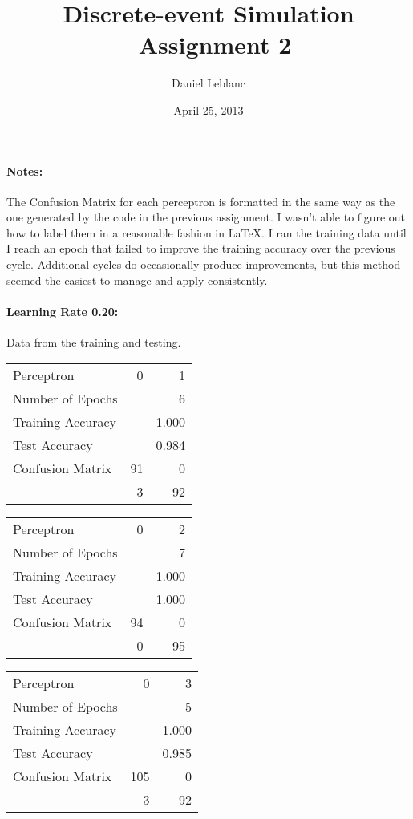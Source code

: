 \documentclass[11pt]{article}
\author{Daniel Leblanc}
\title{Discrete-event Simulation \ Assignment 2}
\date{April 25, 2013}
\begin{document}
\maketitle
\paragraph{Notes:} The Confusion Matrix for each perceptron is formatted in the same way as the one generated by the code in the previous assignment.  I wasn't able to figure out how to label them in a reasonable fashion in LaTeX.  I ran the training data until I reach an epoch that failed to improve the training accuracy over the previous cycle.  Additional cycles do occasionally produce improvements, but this method seemed the easiest to manage and apply consistently.
\paragraph{Learning Rate 0.20:}Data from the training and testing.\\
\begin{minipage}[t]{0.5\textwidth}
\begin{tabular}{|l | r r|}
\hline Perceptron & 0 & 1\\
Number of Epochs & & 6\\
Training Accuracy & & 1.000\\
Test Accuracy & & 0.984\\
Confusion Matrix & 91 & 0\\
 &3 & 92\\ \hline
\end{tabular}
\end{minipage}
\begin{minipage}[t]{0.5\textwidth}
\begin{tabular}{|l | r r|}
\hline Perceptron & 0 & 2\\
Number of Epochs & & 7\\
Training Accuracy & & 1.000\\
Test Accuracy & & 1.000\\
Confusion Matrix & 94 & 0\\
 &0 & 95\\ \hline
\end{tabular}
\end{minipage}
\begin{minipage}[t]{0.5\textwidth}
\begin{tabular}{|l | r r|}
\hline Perceptron & 0 & 3\\
Number of Epochs & & 5\\
Training Accuracy & & 1.000\\
Test Accuracy & & 0.985\\
Confusion Matrix & 105 & 0\\
 &3 & 92\\ \hline
\end{tabular}
\end{minipage}
\end{document}

